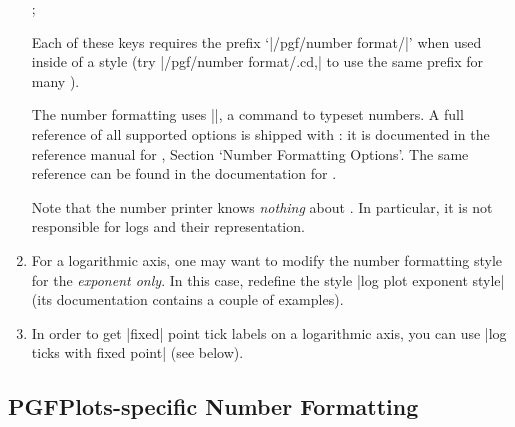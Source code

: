 \begin{enumerate}
\begin{codeexample}[]
;
\end{codeexample}

\begin{codeexample}[]
\end{codeexample}

\begin{codeexample}[]
\end{codeexample}

\begin{codeexample}[]
\end{codeexample}
        \noindent Each of these keys requires the prefix
        `|/pgf/number format/|' when used inside of a \PGFPlots{} style (try
        |/pgf/number format/.cd,| to use the same
        prefix for many ).

        The number formatting uses |\pgfmathprintnumber|, a \pgfname{} command
        to typeset numbers. A full reference of all supported options is
        shipped with \PGFPlots{}: it is documented in the reference manual for
        \PGFPlotstable{}, Section `Number Formatting Options'. The same
        reference can be found in the documentation for \pgfname{}.

        Note that the number printer knows \emph{nothing} about \PGFPlots{}. In
        particular, it is not responsible for logs and their representation.
    \item For a logarithmic axis, one may want to modify the number
        formatting style for the \emph{exponent only}. In this case, redefine
        the style |log plot exponent style| (its documentation contains a
        couple of examples).
    \item In order to get |fixed| point tick labels on a logarithmic axis,
        you can use |log ticks with fixed point| (see below).
\end{enumerate}


\subsection{PGFPlots-specific Number Formatting}


